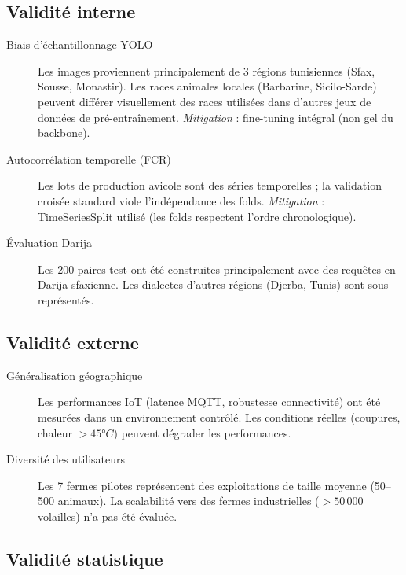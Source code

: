 \subsection{Validité interne}

\begin{description}
  \item[Biais d'échantillonnage YOLO] Les images proviennent principalement
        de 3 régions tunisiennes (Sfax, Sousse, Monastir). Les races animales
        locales (Barbarine, Sicilo-Sarde) peuvent différer visuellement des
        races utilisées dans d'autres jeux de données de pré-entraînement.
        \textit{Mitigation} : fine-tuning intégral (non gel du backbone).
  \item[Autocorrélation temporelle (FCR)] Les lots de production avicole
        sont des séries temporelles ; la validation croisée standard viole
        l'indépendance des folds. \textit{Mitigation} : TimeSeriesSplit
        utilisé (les folds respectent l'ordre chronologique).
  \item[Évaluation Darija] Les 200 paires test ont été construites
        principalement avec des requêtes en Darija sfaxienne. Les dialectes
        d'autres régions (Djerba, Tunis) sont sous-représentés.
\end{description}

\subsection{Validité externe}

\begin{description}
  \item[Généralisation géographique] Les performances IoT (latence MQTT,
        robustesse connectivité) ont été mesurées dans un environnement contrôlé.
        Les conditions réelles (coupures, chaleur $> 45°C$) peuvent dégrader
        les performances.
  \item[Diversité des utilisateurs] Les 7 fermes pilotes représentent
        des exploitations de taille moyenne (50--500 animaux). La scalabilité
        vers des fermes industrielles ($> 50\,000$ volailles) n'a pas été évaluée.
\end{description}

\subsection{Validité statistique}

